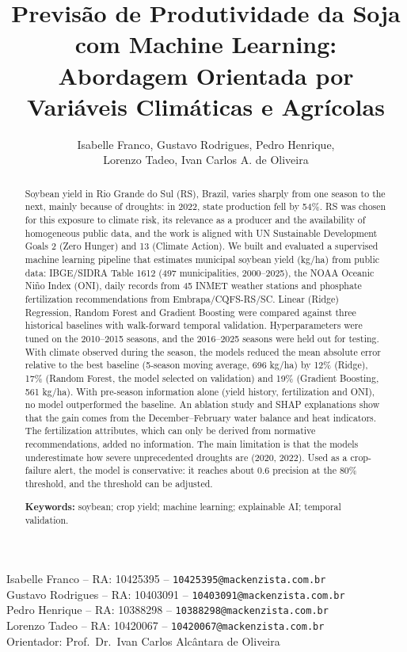 \documentclass[12pt]{article}
\title{Previsão de Produtividade da Soja com Machine Learning: Abordagem Orientada por Variáveis Climáticas e Agrícolas}
\author{Isabelle Franco\inst{1}, Gustavo Rodrigues\inst{1}, Pedro Henrique\inst{1},\\
  Lorenzo Tadeo\inst{1}, Ivan Carlos A. de Oliveira\inst{1}}
\begin{document}
\maketitle

\begin{center}
\footnotesize
Isabelle Franco -- RA: 10425395 -- \texttt{10425395@mackenzista.com.br}\\
Gustavo Rodrigues -- RA: 10403091 -- \texttt{10403091@mackenzista.com.br}\\
Pedro Henrique -- RA: 10388298 -- \texttt{10388298@mackenzista.com.br}\\
Lorenzo Tadeo -- RA: 10420067 -- \texttt{10420067@mackenzista.com.br}\\
Orientador: Prof.\ Dr.\ Ivan Carlos Alcântara de Oliveira
\end{center}

\begin{abstract}
  Soybean yield in Rio Grande do Sul (RS), Brazil, varies sharply from one
  season to the next, mainly because of droughts: in 2022, state production
  fell by 54\%. RS was chosen for this exposure to climate risk, its
  relevance as a producer and the availability of homogeneous public data,
  and the work is aligned with UN Sustainable Development Goals 2 (Zero
  Hunger) and 13 (Climate Action). We built and evaluated a
  supervised machine learning pipeline that estimates municipal soybean
  yield (kg/ha) from public data: IBGE/SIDRA Table 1612 (497 municipalities,
  2000--2025), the NOAA Oceanic Niño Index (ONI), daily records from 45 INMET
  weather stations and phosphate fertilization recommendations from
  Embrapa/CQFS-RS/SC. Linear (Ridge) Regression, Random Forest and Gradient
  Boosting were compared against three historical baselines with
  walk-forward temporal validation. Hyperparameters were tuned on the
  2010--2015 seasons, and the 2016--2025 seasons were held out for testing.
  With climate observed during the season, the models reduced the mean
  absolute error relative to the best baseline (5-season moving average,
  696 kg/ha) by 12\% (Ridge), 17\% (Random Forest, the model selected on
  validation) and 19\% (Gradient Boosting, 561 kg/ha). With pre-season
  information alone (yield history, fertilization and ONI), no model
  outperformed the baseline. An ablation study and SHAP explanations show
  that the gain comes from the December--February water balance and heat
  indicators. The fertilization attributes, which can only be derived from
  normative recommendations, added no information. The main limitation is
  that the models underestimate how severe unprecedented droughts are (2020,
  2022). Used as a crop-failure alert, the model is conservative: it reaches
  about 0.6 precision at the 80\% threshold, and the threshold can be
  adjusted.

  \noindent\textbf{Keywords:} soybean; crop yield; machine learning;
  explainable AI; temporal validation.
\end{abstract}
\end{document}
